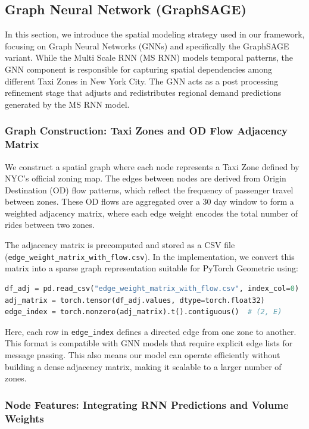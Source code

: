 \documentclass{article}
\begin{document}
\subsection{Graph Neural Network (GraphSAGE)}

In this section, we introduce the spatial modeling strategy used in our framework, focusing on Graph Neural Networks (GNNs) and specifically the GraphSAGE variant. While the Multi Scale RNN (MS RNN) models temporal patterns, the GNN component is responsible for capturing spatial dependencies among different Taxi Zones in New York City. The GNN acts as a post processing refinement stage that adjusts and redistributes regional demand predictions generated by the MS RNN model.

\subsubsection{Graph Construction: Taxi Zones and OD Flow Adjacency Matrix}

We construct a spatial graph where each node represents a Taxi Zone defined by NYC's official zoning map. The edges between nodes are derived from Origin Destination (OD) flow patterns, which reflect the frequency of passenger travel between zones. These OD flows are aggregated over a 30 day window to form a weighted adjacency matrix, where each edge weight encodes the total number of rides between two zones.

The adjacency matrix is precomputed and stored as a CSV file (\texttt{edge\_weight\_matrix\_with\_flow.csv}). In the implementation, we convert this matrix into a sparse graph representation suitable for PyTorch Geometric using:

\begin{lstlisting}[language=Python, caption={Adjacency Matrix to Edge Index}]
df_adj = pd.read_csv("edge_weight_matrix_with_flow.csv", index_col=0)
adj_matrix = torch.tensor(df_adj.values, dtype=torch.float32)
edge_index = torch.nonzero(adj_matrix).t().contiguous()  # (2, E)
\end{lstlisting}

Here, each row in \texttt{edge\_index} defines a directed edge from one zone to another. This format is compatible with GNN models that require explicit edge lists for message passing. This also means our model can operate efficiently without building a dense adjacency matrix, making it scalable to a larger number of zones.

\subsubsection{Node Features: Integrating RNN Predictions and Volume Weights}
\end{document}
